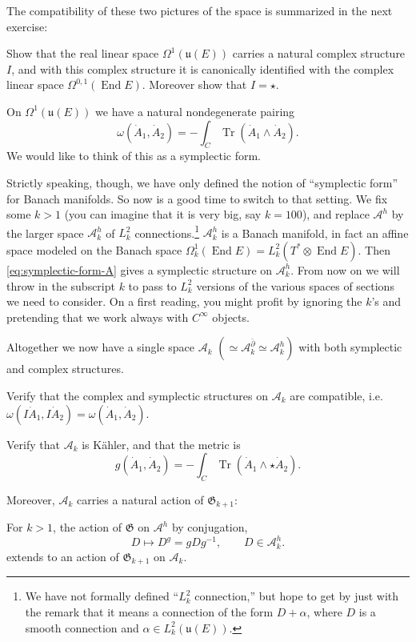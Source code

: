 \documentclass[12pt,letterpaper,reqno]{article}
\numberwithin{equation}{section}
\newcommand{\fu}{{\mathfrak u}}
\newcommand{\fG}{{\mathfrak G}}
\newcommand{\cA}{\ensuremath{\mathcal A}}
\newcommand{\kahler}{K\"ahler\xspace}
\DeclareMathOperator{\Tr}{Tr}
\DeclareMathOperator{\End}{End}
\begin{document}
The compatibility of these two pictures of the space 
is summarized in the next exercise:

\begin{exercise} Show that the real linear space 
$\Omega^{1}(\fu(E))$ carries a natural complex structure $I$,
and with this complex structure it is canonically identified
with the complex linear space $\Omega^{0,1}(\End E)$.
Moreover show that $I = \star$.
\end{exercise}

On $\Omega^{1}(\fu(E))$ we have a natural nondegenerate pairing
\begin{equation} \label{eq:symplectic-form-A}
  \omega(\dot{A}_1,\dot{A}_2) = -\int_C \Tr(\dot{A}_1 \wedge \dot{A}_2).
\end{equation}
We would like to think of this as a symplectic form.

Strictly speaking, though, we have only defined the notion
of ``symplectic form'' for Banach manifolds.
So now is a good time to switch to that setting.
We fix some $k > 1$ (you can imagine that it is very big,
say $k = 100$), and replace $\cA^h$ by the larger space $\cA^h_k$
of $L^2_k$ connections.\footnote{We have not formally defined
``$L^2_k$ connection,'' but hope to get by just with the remark 
that it means a connection of the form $D + \alpha$, 
where $D$ is a smooth connection and $\alpha \in L^2_k(\fu(E))$.}
$\cA^h_k$ is a Banach manifold,
in fact an affine space modeled on the Banach space
$\Omega^1_k(\End E) = L^2_k(T^* \otimes \End E)$. 
Then \eqref{eq:symplectic-form-A} gives a symplectic 
structure on $\cA^h_k$.
From now on we will throw in the subscript $k$ to pass 
to $L^2_k$ versions of the various spaces of sections
we need to consider. On a first reading, you might profit
by ignoring the $k$'s and pretending that we work always
with $C^\infty$ objects.

Altogether we now have a single space $\cA_k$ $(\simeq \cA^{\bar\partial}_k \simeq \cA^h_k)$ with both symplectic and
complex structures.
\begin{exercise} Verify that the complex and symplectic structures
on $\cA_k$ are compatible, i.e. $\omega(I \dot{A}_1, I \dot{A}_2) = \omega(\dot{A}_1,\dot{A}_2)$.
\end{exercise}

\begin{exercise} Verify that $\cA_k$ is \kahler, and that the metric is
\begin{equation}
  g(\dot{A}_1,\dot{A}_2) = - \int_C \Tr(\dot{A}_1 \wedge \star \dot{A}_2).
\end{equation}
\end{exercise}
Moreover, $\cA_k$ carries a natural action of $\fG_{k+1}$:
\begin{prop} For $k>1$, the action of $\fG$ on $\cA^h$ by conjugation,
\begin{equation}
  D \mapsto D^g = g D g^{-1}, \qquad D \in \cA^h_k.
\end{equation}
extends to an action of $\fG_{k+1}$ on $\cA_k$.
\end{prop}
\end{document}
